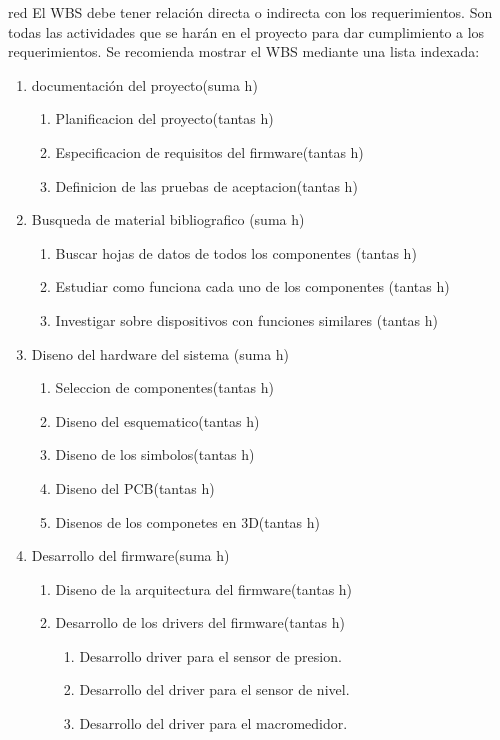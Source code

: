\documentclass[
11pt, %
codirector, %
]{charter}
\begin{document}
\begin{consigna}{red}
El WBS debe tener relación directa o indirecta con los requerimientos.  Son todas las actividades que se harán en el proyecto para dar cumplimiento a los requerimientos. Se recomienda mostrar el WBS mediante una lista indexada:

\begin{enumerate}
\item documentación del proyecto(suma h)
	\begin{enumerate}
	\item Planificacion del proyecto(tantas h)
	\item Especificacion de requisitos del firmware(tantas h)
	\item Definicion de las pruebas de aceptacion(tantas h)
	\end{enumerate}
\item Busqueda de material bibliografico (suma h)
	\begin{enumerate}
	\item Buscar hojas de datos de todos los componentes (tantas h)
	\item Estudiar como funciona cada uno de los componentes (tantas h)
	\item Investigar sobre dispositivos con funciones similares (tantas h)
	\end{enumerate}
\item Diseno del hardware del sistema (suma h)
	\begin{enumerate}
	\item Seleccion de componentes(tantas h)
	\item Diseno del esquematico(tantas h)
	\item Diseno de los simbolos(tantas h)
	\item Diseno del PCB(tantas h)
	\item Disenos de los componetes en 3D(tantas h)
	\end{enumerate}
\item Desarrollo del firmware(suma h)
	\begin{enumerate}
	\item Diseno de la arquitectura del firmware(tantas h)
	\item Desarrollo de los drivers del firmware(tantas h)
	\begin{enumerate}
		\item Desarrollo driver para el sensor de presion.
		\item Desarrollo del driver para el sensor de nivel.
		\item Desarrollo del driver para el macromedidor.

\end{enumerate}
\end{enumerate}
\end{enumerate}
\end{consigna}
\end{document}
